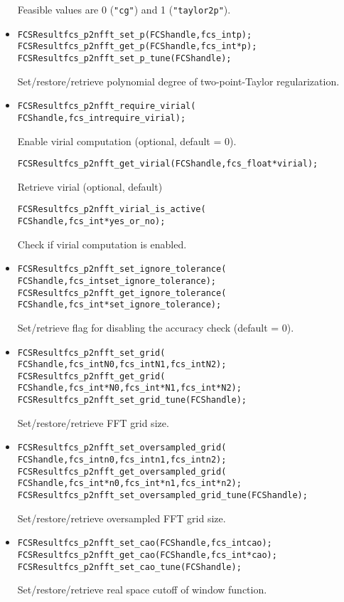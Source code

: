 \begin{itemize}
    Feasible values are 0 (\verb!"cg"!) and 1 (\verb!"taylor2p"!).
  \item
\begin{alltt}
FCSResult fcs_p2nfft_set_p(FCS handle, fcs_int p);
FCSResult fcs_p2nfft_get_p(FCS handle, fcs_int* p);
FCSResult fcs_p2nfft_set_p_tune(FCS handle);
\end{alltt}
    Set/restore/retrieve polynomial degree of two-point-Taylor regularization.
  \item
\begin{alltt}
FCSResult fcs_p2nfft_require_virial(
    FCS handle, fcs_int require_virial);
\end{alltt}
    Enable virial computation (optional, default = 0).
\begin{alltt}
FCSResult fcs_p2nfft_get_virial(FCS handle, fcs_float* virial);
\end{alltt}
    Retrieve virial (optional, default)
\begin{alltt}
FCSResult fcs_p2nfft_virial_is_active(
    FCS handle, fcs_int* yes_or_no);
\end{alltt}
    Check if virial computation is enabled.
  \item
\begin{alltt}
FCSResult fcs_p2nfft_set_ignore_tolerance(
    FCS handle, fcs_int set_ignore_tolerance);
FCSResult fcs_p2nfft_get_ignore_tolerance(
    FCS handle, fcs_int* set_ignore_tolerance);
\end{alltt}
    Set/retrieve flag for disabling the accuracy check (default = 0).
  \item
\begin{alltt}
FCSResult fcs_p2nfft_set_grid(
    FCS handle, fcs_int N0, fcs_int N1, fcs_int N2);
FCSResult fcs_p2nfft_get_grid(
    FCS handle, fcs_int* N0, fcs_int* N1, fcs_int* N2);
FCSResult fcs_p2nfft_set_grid_tune(FCS handle);
\end{alltt}
    Set/restore/retrieve FFT grid size.
  \item
\begin{alltt}
FCSResult fcs_p2nfft_set_oversampled_grid(
    FCS handle, fcs_int n0, fcs_int n1, fcs_int n2);
FCSResult fcs_p2nfft_get_oversampled_grid(
    FCS handle, fcs_int* n0, fcs_int* n1, fcs_int* n2);
FCSResult fcs_p2nfft_set_oversampled_grid_tune(FCS handle);
\end{alltt}
    Set/restore/retrieve oversampled FFT grid size.
  \item
\begin{alltt}
FCSResult fcs_p2nfft_set_cao(FCS handle, fcs_int cao);
FCSResult fcs_p2nfft_get_cao(FCS handle, fcs_int* cao);
FCSResult fcs_p2nfft_set_cao_tune(FCS handle);
\end{alltt}
    Set/restore/retrieve real space cutoff of window function.
\end{itemize}

